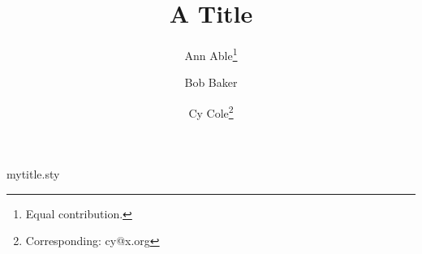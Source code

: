 \begin{filecontents*}[overwrite]{mytitle.sty}
\renewcommand\maketitle{\par\begingroup
 \renewcommand\thefootnote{\fnsymbol{footnote}}%
 \begin{center}{\LARGE\@title\par}\vskip 1em
 {\large\begin{tabular}[t]{c}\@author\end{tabular}\par}\end{center}
 \@thanks\endgroup\setcounter{footnote}{0}}
\end{filecontents*}
\documentclass{article}
\usepackage{mytitle}
\newcommand\samethanks[1][\value{footnote}]{\footnotemark[#1]}
\title{A Title}
\author{Ann Able\thanks{Equal contribution.} \and Bob Baker\samethanks \and Cy Cole\thanks{Corresponding: cy@x.org}}

\maketitle
Body text.

